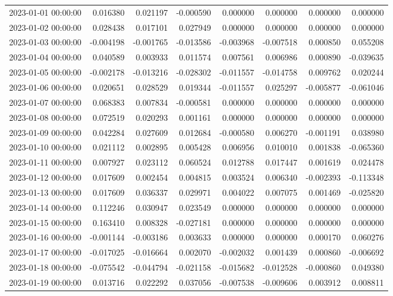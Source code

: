 \begin{tabular}{lrrrrrrr}
2023-01-01 00:00:00 & 0.016380 & 0.021197 & -0.000590 & 0.000000 & 0.000000 & 0.000000 & 0.000000 \\
2023-01-02 00:00:00 & 0.028438 & 0.017101 & 0.027949 & 0.000000 & 0.000000 & 0.000000 & 0.000000 \\
2023-01-03 00:00:00 & -0.004198 & -0.001765 & -0.013586 & -0.003968 & -0.007518 & 0.000850 & 0.055208 \\
2023-01-04 00:00:00 & 0.040589 & 0.003933 & 0.011574 & 0.007561 & 0.006986 & 0.000890 & -0.039635 \\
2023-01-05 00:00:00 & -0.002178 & -0.013216 & -0.028302 & -0.011557 & -0.014758 & 0.009762 & 0.020244 \\
2023-01-06 00:00:00 & 0.020651 & 0.028529 & 0.019344 & -0.011557 & 0.025297 & -0.005877 & -0.061046 \\
2023-01-07 00:00:00 & 0.068383 & 0.007834 & -0.000581 & 0.000000 & 0.000000 & 0.000000 & 0.000000 \\
2023-01-08 00:00:00 & 0.072519 & 0.020293 & 0.001161 & 0.000000 & 0.000000 & 0.000000 & 0.000000 \\
2023-01-09 00:00:00 & 0.042284 & 0.027609 & 0.012684 & -0.000580 & 0.006270 & -0.001191 & 0.038980 \\
2023-01-10 00:00:00 & 0.021112 & 0.002895 & 0.005428 & 0.006956 & 0.010010 & 0.001838 & -0.065360 \\
2023-01-11 00:00:00 & 0.007927 & 0.023112 & 0.060524 & 0.012788 & 0.017447 & 0.001619 & 0.024478 \\
2023-01-12 00:00:00 & 0.017609 & 0.002454 & 0.004815 & 0.003524 & 0.006340 & -0.002393 & -0.113348 \\
2023-01-13 00:00:00 & 0.017609 & 0.036337 & 0.029971 & 0.004022 & 0.007075 & 0.001469 & -0.025820 \\
2023-01-14 00:00:00 & 0.112246 & 0.030947 & 0.023549 & 0.000000 & 0.000000 & 0.000000 & 0.000000 \\
2023-01-15 00:00:00 & 0.163410 & 0.008328 & -0.027181 & 0.000000 & 0.000000 & 0.000000 & 0.000000 \\
2023-01-16 00:00:00 & -0.001144 & -0.003186 & 0.003633 & 0.000000 & 0.000000 & 0.000170 & 0.060276 \\
2023-01-17 00:00:00 & -0.017025 & -0.016664 & 0.002070 & -0.002032 & 0.001439 & 0.000860 & -0.006692 \\
2023-01-18 00:00:00 & -0.075542 & -0.044794 & -0.021158 & -0.015682 & -0.012528 & -0.000860 & 0.049380 \\
2023-01-19 00:00:00 & 0.013716 & 0.022292 & 0.037056 & -0.007538 & -0.009606 & 0.003912 & 0.008811 \\

\end{tabular}
